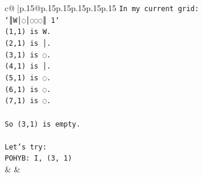 \documentclass{article}
\begin{document}
{\begin{supertabular}{c@{$\;$}|p{.15\linewidth}@{}p{.15\linewidth}p{.15\linewidth}p{.15\linewidth}p{.15\linewidth}p{.15\linewidth}}
{{{\texttt{In my current grid:} \\
\texttt{`║W│◌│◌◌◌║ 1`} \\
\texttt{(1,1) is W.} \\
\texttt{(2,1) is │.} \\
\texttt{(3,1) is ◌.} \\
\texttt{(4,1) is │.} \\
\texttt{(5,1) is ◌.} \\
\texttt{(6,1) is ◌.} \\
\texttt{(7,1) is ◌.} \\
\\ 
\texttt{So (3,1) is empty.} \\
\\ 
\texttt{Let's try:} \\
\texttt{POHYB: I, (3, 1)} \\
            }
        }
    }
    & & \\ \\


\end{supertabular}}
\end{document}

